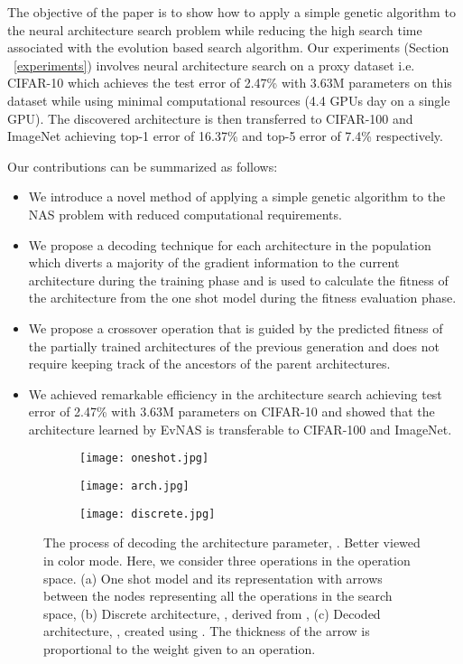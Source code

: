\documentclass[final]{cvpr}
\begin{document}
The objective of the paper is to show how to apply a simple genetic algorithm to the
neural architecture search problem while reducing the high search time associated with 
the evolution based search algorithm. Our experiments (Section ~\ref{experiments}) involves
neural architecture search on a proxy dataset i.e. CIFAR-10 which achieves the
test error of 2.47\% with 3.63M parameters on this dataset while using minimal computational
resources (4.4 GPUs day on a single GPU). The discovered architecture is then transferred to
CIFAR-100 and ImageNet achieving top-1 error of 16.37\% and top-5 error of 7.4\%
respectively.

Our contributions can be summarized as follows:
\begin{itemize}
    \item We introduce a novel method of applying a simple genetic algorithm to the NAS problem with
    reduced computational requirements.
    \item We propose a decoding technique for each architecture in the population which diverts a
    majority of the gradient information to the current architecture during the training phase and is
    used to calculate the fitness of the architecture from the one shot model during the fitness
    evaluation phase.
    \item We propose a crossover operation that is guided by the predicted fitness of the partially
    trained architectures of the previous generation and does not require keeping track of the
    ancestors of the parent architectures.
    \item We achieved remarkable efficiency in the architecture search achieving
    test error of 2.47\% with 3.63M parameters on CIFAR-10 and showed that the architecture
    learned by EvNAS is transferable to CIFAR-100 and ImageNet.
\end{itemize}

\begin{figure*}
  \centering
\begin{subfigure}{0.34\linewidth}
    \texttt{[image: oneshot.jpg]}
    \caption{}
    \label{subfig:darts}
  \end{subfigure}
  \quad
  \begin{subfigure}{0.18\linewidth}
    \texttt{[image: arch.jpg]}
    \caption{}
    \label{subfig:discrete_arch}
  \end{subfigure}
  \quad
  \begin{subfigure}{0.38\linewidth}
    \texttt{[image: discrete.jpg]}
    \caption{}
    \label{subfig:decoded_arch}
  \end{subfigure}
  \caption{The process of decoding the architecture parameter, . Better viewed in
  color mode. Here, we consider three operations in the operation space.
  (a) One shot model and its representation with arrows between the nodes
  representing all the operations in the search space,
  (b) Discrete architecture, , derived from ,
  (c) Decoded architecture, , created using .
  The thickness of the arrow is proportional to the weight given to an operation.}
  \label{fig:arch_represent}
\end{figure*}
\end{document}
